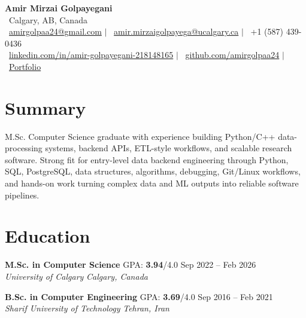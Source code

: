 \documentclass[a4paper,10pt]{article}
\newcommand{\resumeEducationSubheading}[5]{
    \textbf{#1} \hfill #2 \hfill #3 \\
    \textit{#4} \hfill \textit{#5}
}
\begin{document}

\begin{center}
    {\LARGE \textbf{Amir Mirzai Golpayegani}} \\[0.25em]
    \faMapMarker*~Calgary, AB, Canada \\[0.25em]
    \faEnvelope~\href{mailto:amirgolpaa24@gmail.com}{amirgolpaa24@gmail.com}
    $|$
    \faEnvelope~\href{mailto:amir.mirzaigolpayega@ucalgary.ca}{amir.mirzaigolpayega@ucalgary.ca}
    $|$
    \faPhone*~+1 (587) 439-0436 \\[0.25em]
    \faLinkedin~\href{https://linkedin.com/in/amir-golpayegani-218148165}{linkedin.com/in/amir-golpayegani-218148165}
    $|$
    \faGithub~\href{https://github.com/amirgolpaa24}{github.com/amirgolpaa24}
    $|$
    \faGlobe~\href{https://amir-portfolio-navy.vercel.app/}{Portfolio}
\end{center}


\section*{Summary}

M.Sc. Computer Science graduate with experience building Python/C++ data-processing systems, backend APIs, ETL-style workflows, and scalable research software. Strong fit for entry-level data backend engineering through Python, SQL, PostgreSQL, data structures, algorithms, debugging, Git/Linux workflows, and hands-on work turning complex data and ML outputs into reliable software pipelines.


\section*{Education}

\resumeEducationSubheading
{M.Sc. in Computer Science}
{GPA: \textbf{3.94}/4.0}
{Sep 2022 -- Feb 2026}
{University of Calgary}
{Calgary, Canada}

\vspace{0.35em}

\resumeEducationSubheading
{B.Sc. in Computer Engineering}
{GPA: \textbf{3.69}/4.0}
{Sep 2016 -- Feb 2021}
{Sharif University of Technology}
{Tehran, Iran}

\end{document}
